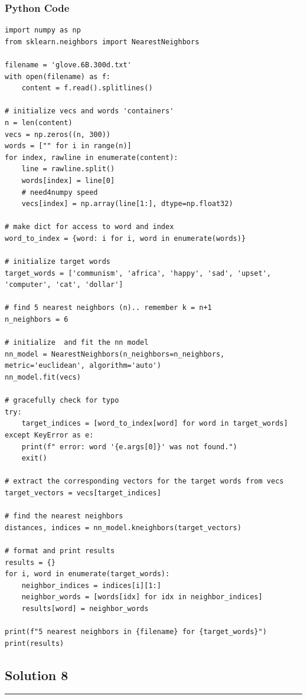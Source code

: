 \documentclass{article}
\begin{document}
\subsubsection*{Python Code}
\begin{lstlisting}
import numpy as np
from sklearn.neighbors import NearestNeighbors

filename = 'glove.6B.300d.txt'
with open(filename) as f:
    content = f.read().splitlines()

# initialize vecs and words 'containers'
n = len(content)
vecs = np.zeros((n, 300))
words = ["" for i in range(n)] 
for index, rawline in enumerate(content):
    line = rawline.split()
    words[index] = line[0]
    # need4numpy speed
    vecs[index] = np.array(line[1:], dtype=np.float32)

# make dict for access to word and index
word_to_index = {word: i for i, word in enumerate(words)}

# initialize target words
target_words = ['communism', 'africa', 'happy', 'sad', 'upset', 'computer', 'cat', 'dollar']

# find 5 nearest neighbors (n).. remember k = n+1
n_neighbors = 6

# initialize  and fit the nn model
nn_model = NearestNeighbors(n_neighbors=n_neighbors, metric='euclidean', algorithm='auto')
nn_model.fit(vecs)

# gracefully check for typo
try:
    target_indices = [word_to_index[word] for word in target_words]
except KeyError as e:
    print(f" error: word '{e.args[0]}' was not found.")
    exit()

# extract the corresponding vectors for the target words from vecs
target_vectors = vecs[target_indices]

# find the nearest neighbors
distances, indices = nn_model.kneighbors(target_vectors)

# format and print results
results = {}
for i, word in enumerate(target_words):
    neighbor_indices = indices[i][1:]
    neighbor_words = [words[idx] for idx in neighbor_indices]
    results[word] = neighbor_words

print(f"5 nearest neighbors in {filename} for {target_words}")
print(results)

\end{lstlisting}

\newpage 
\subsection*{Solution 8}
\noindent\rule{\textwidth}{0.4pt}\\
\end{document}
